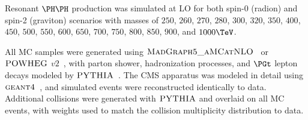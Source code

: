 Resonant $\HH$ production was simulated at LO for both spin-0 (radion) and spin-2 (graviton)
scenarios with masses of $250$, $260$, $270$, $280$, $300$, $320$, $350$, $400$, $450$, $500$, $550$, $600$,
$650$, $700$, $750$, $800$, $850$, $900$, and $1000\TeV$.

All MC samples were generated using $\textsc{MadGraph5\_aMCatNLO}$~\cite{Alwall:2014hca} or
$\textsc{POWHEG}$ $v2$~\cite{Nason:2004rx,Frixione:2007vw,Alioli:2010xd}, with parton shower, hadronization
processes, and $\PGt$ lepton decays modeled by
$\textsc{PYTHIA}$~\cite{PYTHIA_CUETP8M1tune_CMS,PYTHIA_CUETP8M2tune_CMS,Sirunyan:2019dfx,PYTHIA_MonashTune}.
The CMS apparatus was modeled in detail using $\textsc{geant4}$~\cite{Agostinelli:2002hh}, and simulated events
were reconstructed identically to data.  Additional collisions were generated with $\textsc{PYTHIA}$ and
overlaid on all MC events, with weights used to match the collision multiplicity distribution to data.

